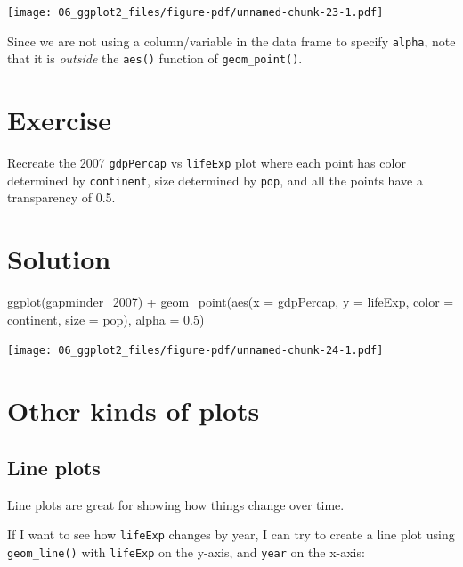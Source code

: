 \documentclass[
  letterpaper,
  DIV=11,
  numbers=noendperiod]{scrreprt}
\newenvironment{Shaded}{\begin{snugshade}}{\end{snugshade}}
\newcommand{\AttributeTok}[1]{\textcolor[rgb]{0.40,0.45,0.13}{#1}}
\newcommand{\FloatTok}[1]{\textcolor[rgb]{0.68,0.00,0.00}{#1}}
\newcommand{\FunctionTok}[1]{\textcolor[rgb]{0.28,0.35,0.67}{#1}}
\newcommand{\NormalTok}[1]{\textcolor[rgb]{0.00,0.23,0.31}{#1}}
\newcommand{\SpecialCharTok}[1]{\textcolor[rgb]{0.37,0.37,0.37}{#1}}
\begin{document}
\texttt{[image: 06\_ggplot2\_files/figure-pdf/unnamed-chunk-23-1.pdf]}

Since we are not using a column/variable in the data frame to specify
\texttt{alpha}, note that it is \emph{outside} the \texttt{aes()}
function of \texttt{geom\_point()}.

\section{Exercise}

Recreate the 2007 \texttt{gdpPercap} vs \texttt{lifeExp} plot where each
point has color determined by \texttt{continent}, size determined by
\texttt{pop}, and all the points have a transparency of 0.5.

\section{Solution}

\begin{Shaded}
\begin{Highlighting}[]
\FunctionTok{ggplot}\NormalTok{(gapminder\_2007) }\SpecialCharTok{+} 
  \FunctionTok{geom\_point}\NormalTok{(}\FunctionTok{aes}\NormalTok{(}\AttributeTok{x =}\NormalTok{ gdpPercap, }\AttributeTok{y =}\NormalTok{ lifeExp, }
                 \AttributeTok{color =}\NormalTok{ continent, }\AttributeTok{size =}\NormalTok{ pop), }
             \AttributeTok{alpha =} \FloatTok{0.5}\NormalTok{)}
\end{Highlighting}
\end{Shaded}

\texttt{[image: 06\_ggplot2\_files/figure-pdf/unnamed-chunk-24-1.pdf]}

\section{Other kinds of plots}\label{other-kinds-of-plots}

\subsection{Line plots}\label{line-plots}

Line plots are great for showing how things change over time.

If I want to see how \texttt{lifeExp} changes by year, I can try to
create a line plot using \texttt{geom\_line()} with \texttt{lifeExp} on
the y-axis, and \texttt{year} on the x-axis:
\end{document}
